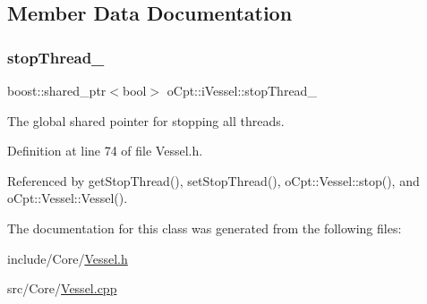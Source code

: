 \subsection{Member Data Documentation}
\hypertarget{classo_cpt_1_1i_vessel_a9f52bb65db31b6eea42e29a6213dd78a}{}\label{classo_cpt_1_1i_vessel_a9f52bb65db31b6eea42e29a6213dd78a} 
\subsubsection{\texorpdfstring{stop\+Thread\+\_\+}{stopThread\_}}
{\footnotesize\ttfamily boost\+::shared\+\_\+ptr$<$bool$>$ o\+Cpt\+::i\+Vessel\+::stop\+Thread\+\_\+\hspace{0.3cm}{\ttfamily [protected]}}



The global shared pointer for stopping all threads. 



Definition at line 74 of file Vessel.\+h.



Referenced by get\+Stop\+Thread(), set\+Stop\+Thread(), o\+Cpt\+::\+Vessel\+::stop(), and o\+Cpt\+::\+Vessel\+::\+Vessel().



The documentation for this class was generated from the following files\+:\begin{DoxyCompactItemize}
\item 
include/\+Core/\hyperlink{_vessel_8h}{Vessel.\+h}\item 
src/\+Core/\hyperlink{_vessel_8cpp}{Vessel.\+cpp}\end{DoxyCompactItemize}
